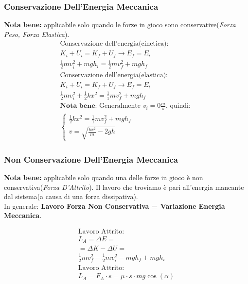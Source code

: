 \subsubsection{Conservazione Dell'Energia Meccanica}
\textbf{Nota bene: } applicabile solo quando le forze in gioco sono conservative(\textit{Forza Peso, Forza Elastica}).
\begin{gather*}
    \text{Conservazione dell'energia(cinetica): } \\ K_i + U_i = K_f + U_f \rightarrow E_f = E_i \\ \frac{1}{2} m v_i^2 + mgh_i = \frac{1}{2} mv_f^2 + mgh_f \\
    \text{Conservazione dell'energia(elastica): } \\ K_i + U_i = K_f + U_f \rightarrow E_f = E_i \\ \frac{1}{2} m v_i^2 + \frac{1}{2}kx^2 = \frac{1}{1}mv_f^2 + mgh_f \\
    \textbf{Nota bene: }\text{Generalmente $v_i = 0 \frac{m}{s}$, quindi: } \\
    \begin{cases}
        \frac{1}{2}kx^2 = \frac{1}{1}mv_f^2 + mgh_f \\
        v = \sqrt{\frac{k x^2}{m} - 2gh}
    \end{cases}
\end{gather*}

\subsubsection{Non Conservazione Dell'Energia Meccanica}

\textbf{Nota bene: } applicabile solo quando una delle forze in gioco è non conservativa(\textit{Forza D'Attrito}). Il lavoro che troviamo è pari all'energia mancante dal sistema(a causa di una forza dissipativa). \\
In generale: \textbf{Lavoro Forza Non Conservativa = Variazione Energia Meccanica}.

\begin{gather*}
    \text{Lavoro Attrito: } \\ L_A = \Delta E = \\ = \Delta K - \Delta U = \\ \frac{1}{2} m v_f^2 - \frac{1}{2} m v_i^2 - mgh_f + mgh_i \\
    \text{Lavoro Attrito: } \\ L_A = F_{A} \cdot s = \mu \cdot s \cdot m g \cos (\alpha)
\end{gather*}